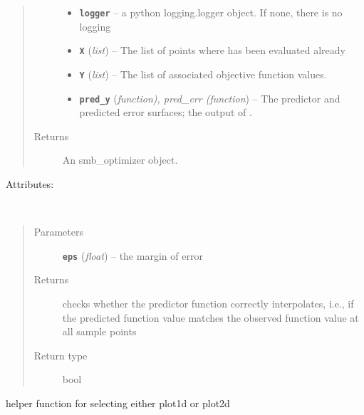 \documentclass[letterpaper,10pt,english]{sphinxmanual}
\begin{document}
\begin{fulllineitems}
\begin{quote}
\begin{description}
\begin{itemize}
\item {} 
\textbf{\texttt{logger}} -- a python logging.logger object. If none, there is no logging

\item {} 
\textbf{\texttt{X}} (\emph{list}) -- The list of points where  has been evaluated already

\item {} 
\textbf{\texttt{Y}} (\emph{list}) -- The list of associated objective function values.

\item {} 
\textbf{\texttt{pred\_y}} (\emph{function), pred\_err (function}) -- The predictor and predicted error surfaces; the output of .

\end{itemize}

\item[{Returns}] \leavevmode
An smb\_optimizer object.

\end{description}\end{quote}

Attributes:

\begin{fulllineitems}
\label{index:smbo.smb_optimizer.smb_optimizer.check_memory}~\begin{quote}\begin{description}
\item[{Parameters}] \leavevmode
\textbf{\texttt{eps}} (\emph{float}) -- the margin of error

\item[{Returns}] \leavevmode
checks whether the predictor function correctly interpolates, i.e., if
the predicted function value matches the observed function value at all sample points

\item[{Return type}] \leavevmode
bool

\end{description}\end{quote}

\end{fulllineitems}


\begin{fulllineitems}
\label{index:smbo.smb_optimizer.smb_optimizer.dim_plotter}
helper function for selecting either plot1d or plot2d


\end{fulllineitems}
\end{fulllineitems}
\end{document}

